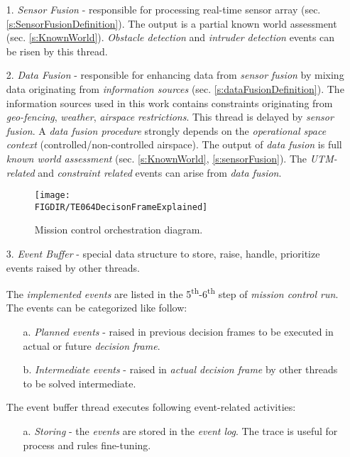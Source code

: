 \begin{itemize}
    \item[1.] \emph{Sensor Fusion} - responsible for processing real-time sensor array (sec. \ref{s:SensorFusionDefinition}). The output is a partial known world assessment (sec. \ref{s:KnownWorld}). \emph{Obstacle detection} and \emph{intruder detection} events can be risen by this thread. 
    
    \item[2.] \emph{Data Fusion} - responsible for enhancing data from \emph{sensor fusion} by mixing data originating from \emph{information sources} (sec. \ref{s:dataFusionDefinition}). The information sources used in this work contains constraints originating from \emph{geo-fencing}, \emph{weather}, \emph{airspace restrictions}. This thread is delayed by \emph{sensor fusion}. A \emph{data fusion procedure} strongly depends on the \emph{operational space context} (controlled/non-controlled airspace). The output of \emph{data fusion} is full \emph{known world assessment} (sec. \ref{s:KnownWorld}, \ref{s:sensorFusion}). The \emph{UTM-related} and \emph{constraint related} events can arise from \emph{data fusion}.
    
    
\begin{figure}[H]
    \centering
    \texttt{[image: \\FIGDIR/TE064DecisonFrameExplained]}
    \caption{Mission control orchestration diagram.}
    \label{fig:misisonControlRunOrchestrationDiagram}
\end{figure}

    \item[3.] \emph{Event Buffer} -  special data structure to store, raise, handle, prioritize events raised by other threads. 
    
    The \emph{implemented events} are listed in the  5\textsuperscript{th}-6\textsuperscript{th} step of \emph{mission control run}. The events can be categorized like follow:
    \begin{itemize}
        \item[a.] \emph{Planned events} - raised in previous decision frames to be executed in actual or future \emph{decision frame}. 
        
        \item[b.] \emph{Intermediate events} - raised in \emph{actual decision frame} by other threads to be solved intermediate. 
    \end{itemize}
    
    The event buffer thread executes following event-related activities:
    \begin{itemize}
        \item[a.] \emph{Storing} - the \emph{events} are stored in the \emph{event log}. The trace is useful for process and rules fine-tuning. 
        

\end{itemize}
\end{itemize}

